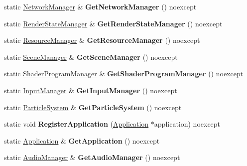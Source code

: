 \begin{DoxyCompactItemize}
static \hyperlink{class_blade_1_1_network_manager}{Network\+Manager} \& {\bfseries Get\+Network\+Manager} () noexcept
\item 
\mbox{\label{class_blade_1_1_engine_context_a31c0db645fa12534692516f7f5ae270f}} 
static \hyperlink{class_blade_1_1_render_state_manager}{Render\+State\+Manager} \& {\bfseries Get\+Render\+State\+Manager} () noexcept
\item 
\mbox{\label{class_blade_1_1_engine_context_a8335eb461fad9d929028158c4f389ffa}} 
static \hyperlink{class_blade_1_1_resource_manager}{Resource\+Manager} \& {\bfseries Get\+Resource\+Manager} () noexcept
\item 
\mbox{\label{class_blade_1_1_engine_context_a377c7a9650027e9bf635bcfa2a2cb5d5}} 
static \hyperlink{class_blade_1_1_scene_manager}{Scene\+Manager} \& {\bfseries Get\+Scene\+Manager} () noexcept
\item 
\mbox{\label{class_blade_1_1_engine_context_a0d3725af9576da43c54ec182b0bb797f}} 
static \hyperlink{class_blade_1_1_shader_program_manager}{Shader\+Program\+Manager} \& {\bfseries Get\+Shader\+Program\+Manager} () noexcept
\item 
\mbox{\label{class_blade_1_1_engine_context_aa4fcca132d847fe4c9ee9a16b7e347d3}} 
static \hyperlink{class_blade_1_1_input_manager}{Input\+Manager} \& {\bfseries Get\+Input\+Manager} () noexcept
\item 
\mbox{\label{class_blade_1_1_engine_context_aca2df73f49a3b33af733e1c04cdef040}} 
static \hyperlink{class_blade_1_1_particle_system}{Particle\+System} \& {\bfseries Get\+Particle\+System} () noexcept
\item 
\mbox{\label{class_blade_1_1_engine_context_a1cb4db31c19ed43f5050cafd57b78bde}} 
static void {\bfseries Register\+Application} (\hyperlink{class_blade_1_1_application}{Application} $\ast$application) noexcept
\item 
\mbox{\label{class_blade_1_1_engine_context_aa3f0da18a061c021d031951b68e461c9}} 
static \hyperlink{class_blade_1_1_application}{Application} \& {\bfseries Get\+Application} () noexcept
\item 
\mbox{\label{class_blade_1_1_engine_context_a0fbfe001768f56cc80437751bd453225}} 
static \hyperlink{class_blade_1_1_audio_manager}{Audio\+Manager} \& {\bfseries Get\+Audio\+Manager} () noexcept
\end{DoxyCompactItemize}



